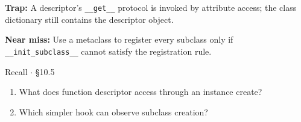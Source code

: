 \documentclass[11pt]{article}
\begin{document}
\begin{keepsection}
\begin{notebox}\textbf{Trap:} A descriptor’s \texttt{\_\_get\_\_} protocol is invoked by attribute access; the class dictionary still contains the descriptor object.\end{notebox}

\begin{notebox}\textbf{Near miss:} Use a metaclass to register every subclass only if \texttt{\_\_init\_subclass\_\_} cannot satisfy the registration rule.\end{notebox}

\begin{recallbox}{Recall \ensuremath{\cdot} §10.5}
\begin{enumerate}
\item What does function descriptor access through an instance create?
\item Which simpler hook can observe subclass creation?
\end{enumerate}

\end{recallbox}
\end{keepsection}
\end{document}
